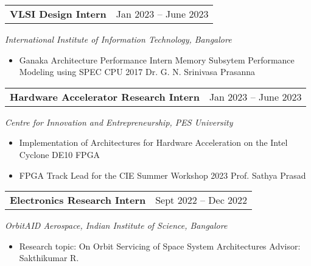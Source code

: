     \begin{tabular}{@{}p{4in}p{2in}}
    {\bf{VLSI Design Intern}} & Jan 2023 – June 2023 \\
    \end{tabular}
    \textit{International Institute of Information Technology, Bangalore}  
    \begin{itemize}
    \setlength\itemsep{0em}
    \item Ganaka Architecture Performance Intern
    \subitem Memory Subsytem Performance Modeling using SPEC CPU 2017
    \subitem Dr. G. N. Srinivasa Prasanna 
    \end{itemize}

    \begin{tabular}{@{}p{4in}p{2in}}
    {\bf{Hardware Accelerator Research Intern}}  & Jan 2023 – June 2023 \\
    \end{tabular}
    \textit{Centre for Innovation and Entrepreneurship, PES University} 
    \begin{itemize}
    \setlength\itemsep{0em}
    \item Implementation of Architectures for Hardware Acceleration on the Intel
    Cyclone DE10 FPGA
    \item FPGA Track Lead for the CIE Summer Workshop 2023
    \subitem Prof. Sathya Prasad 
    \end{itemize}

    \begin{tabular}{@{}p{4in}p{2in}}
    {\bf{Electronics Research Intern}} & Sept 2022 – Dec 2022 \\
    \end{tabular}
    \textit{OrbitAID Aerospace, Indian Institute of Science, Bangalore}  
    \begin{itemize}
    \setlength\itemsep{0em}
    \item Research topic: On Orbit Servicing of Space System Architectures
    \subitem Advisor: Sakthikumar R.
    \end{itemize}

